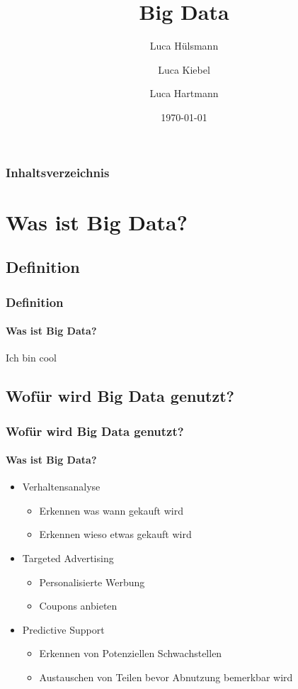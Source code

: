 \documentclass[10pt,a4paper]{beamer}
\author{Luca Hülsmann \and Luca Kiebel \and Luca Hartmann}
\title{Big Data}
\date{\today}
\begin{document}
\begin{frame}
\titlepage
\end{frame}

\begin{frame}
\frametitle{Inhaltsverzeichnis}\tableofcontents
\end{frame}

\section{Was ist Big Data?}

\subsection{Definition}
\begin{frame}
\frametitle{Definition}
\framesubtitle{Was ist Big Data?}
Ich bin cool
\end{frame}

\subsection{Wofür wird Big Data genutzt?}
\begin{frame}
\frametitle{Wofür wird Big Data genutzt?}
\framesubtitle{Was ist Big Data?}
\begin{itemize}
\item Verhaltensanalyse
	\begin{itemize}
	\item Erkennen was wann gekauft wird
	\item Erkennen wieso etwas gekauft wird
	\end{itemize} \pause
\item Targeted Advertising
	\begin{itemize}
	\item Personalisierte Werbung
	\item Coupons anbieten 
	\end{itemize} \pause
\item Predictive Support
	\begin{itemize}
	\item Erkennen von Potenziellen Schwachstellen
	\item Austauschen von Teilen bevor Abnutzung bemerkbar wird
	\end{itemize}
\end{itemize}
\end{frame}
\end{document}
